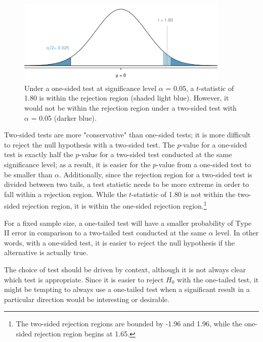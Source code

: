 \begin{figure}[h]
	\centering
	\includegraphics[width=0.9\textwidth]
	{ch_inference_foundations_oi_biostat/figures/twoSidedTestConservative/twoSidedTestConservative}
	\caption{Under a one-sided test at significance level $\alpha$ = 0.05, a $t$-statistic of 1.80 is within the rejection region (shaded light blue). However, it would not be within the rejection region under a two-sided test with $\alpha$ = 0.05 (darker blue).}
	\label{twoSidedTestConservative}
\end{figure}

Two-sided tests are more "conservative" than one-sided tests; it is more difficult to reject the null hypothesis with a two-sided test. The $p$-value for a one-sided test is exactly half the $p$-value for a two-sided test conducted at the same significance level; as a result, it is easier for the $p$-value from a one-sided test to be smaller than $\alpha$. Additionally, since the rejection region for a two-sided test is divided between two tails, a test statistic needs to be more extreme in order to fall within a rejection region. While the $t$-statistic of 1.80 is not within the two-sided rejection region, it is within the one-sided rejection region.\footnote{The two-sided rejection regions are bounded by -1.96 and 1.96, while the one-sided rejection region begins at 1.65.}

For a fixed sample size, a one-tailed test will have a smaller probability of Type II error in comparison to a two-tailed test conducted at the same $\alpha$ level. In other words, with a one-sided test, it is easier to reject the null hypothesis if the alternative is actually true. 

The choice of test should be driven by context, although it is not always clear which test is appropriate. Since it is easier to reject $H_0$ with the one-tailed test, it might be tempting to always use a one-tailed test when a significant result in a particular direction would be interesting or desirable. 

